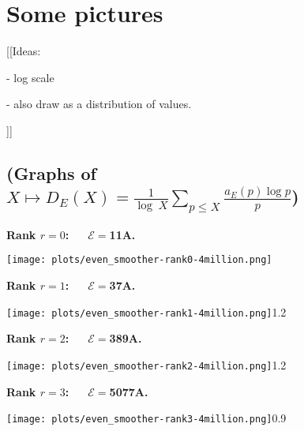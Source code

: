\documentclass[11pt]{article}
\theoremstyle{plain}
\theoremstyle{definition}
\numberwithin{equation}{section}
\numberwithin{figure}{section}
\numberwithin{table}{section}
\begin{document}
\vskip10pt

\section{Some pictures}

[[Ideas:

- log scale

- also draw as a distribution of values.

]]

  \vskip30pt


     \subsection{\bf (Graphs of \ \   $X\mapsto {D}_E(X) = {\frac{1}{\log\ X}}\sum_{p \le X}{\frac{a_E(p)\log p}{ p}}$) }
      \vskip40pt

    \centerline{\bf Rank $r=0$:\ \ \  ${\mathcal E}=$11A.}

   \texttt{[image: plots/even\_smoother-rank0-4million.png]}


 \vskip40pt


  \centerline{\bf Rank $r=1$:\ \ \  ${\mathcal E}=$37A.}


   \vskip20pt



    \texttt{[image: plots/even\_smoother-rank1-4million.png]}{1.2}~\label{s37}
%

   \newpage


  \centerline{\bf Rank $r=2$:\ \ \  ${\mathcal E}=$389A.}


  \vskip20pt




    \texttt{[image: plots/even\_smoother-rank2-4million.png]}{1.2}~\label{s389}


 \vskip20pt


  \centerline{\bf Rank $r=3$:\ \ \  ${\mathcal E}=$5077A.}


 \vskip20pt



    \texttt{[image: plots/even\_smoother-rank3-4million.png]}{0.9}~\label{s5077}
\end{document}
